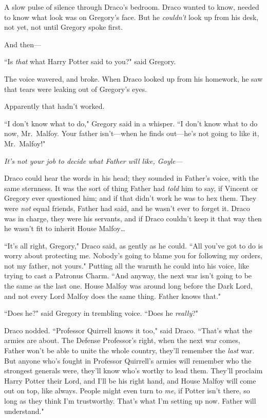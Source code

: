 A slow pulse of silence through Draco's bedroom. Draco wanted to know, needed to know what look was on Gregory's face. But he \emph{couldn't} look up from his desk, not yet, not until Gregory spoke first.

And then---

``Is \emph{that} what Harry Potter said to you?" said Gregory.

The voice wavered, and broke. When Draco looked up from his homework, he saw that tears were leaking out of Gregory's eyes.

Apparently that hadn't worked.

``I don't know what to do," Gregory said in a whisper. ``I don't know what to do now, Mr.~Malfoy. Your father isn't---when he finds out---he's not going to like it, Mr.~Malfoy!"

\emph{It's not \emph{your} job to decide what Father will like, Goyle---}

Draco could hear the words in his head; they sounded in Father's voice, with the same sternness. It was the sort of thing Father had \emph{told} him to say, if Vincent or Gregory ever questioned him; and if that didn't work he was to hex them. They were \emph{not} equal friends, Father had said, and he wasn't ever to forget it. Draco was in charge, they were his servants, and if Draco couldn't keep it that way then he wasn't fit to inherit House Malfoy{\ldots}

``It's all right, Gregory," Draco said, as gently as he could. ``All you've got to do is worry about protecting me. Nobody's going to blame you for following my orders, not my father, not yours." Putting all the warmth he could into his voice, like trying to cast a Patronus Charm. ``And anyway, the next war isn't going to be the same as the last one. House Malfoy was around long before the Dark Lord, and not every Lord Malfoy does the same thing. Father knows that."

``Does he?" said Gregory in trembling voice. ``Does he \emph{really}?"

Draco nodded. ``Professor Quirrell knows it too," said Draco. ``That's what the armies are about. The Defense Professor's right, when the next war comes, Father won't be able to unite the whole country, they'll remember the \emph{last} war. But anyone who's fought in Professor Quirrell's armies will remember who the strongest generals were, they'll know who's worthy to lead them. They'll proclaim Harry Potter their Lord, and I'll be his right hand, and House Malfoy will come out on top, like always. People might even turn to \emph{me}, if Potter isn't there, so long as they think I'm trustworthy. That's what I'm setting up now. Father will understand."

